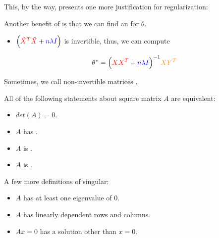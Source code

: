         This, by the way, presents one more justification for regularization:\\

        \begin{concept}
            Another benefit of  is that we can  find an  for $\theta$.

            \begin{itemize}
                \item $\Big ( \textcolor{red}{\tilde{X}^T \tilde{X}} + \textcolor{blue}{n \lambda I} \Big)$ is invertible, thus, we can compute 

                \begin{equation*}
                    \theta^* = \Big ( \textcolor{red}{X X^T} + \textcolor{blue}{n \lambda I} \Big)^{-1} \textcolor{orange}{XY^T}
                \end{equation*}
            \end{itemize}
        \end{concept}

        Sometimes, we call non-invertible matrices .\\

        \begin{definition}
            All of the following statements about square matrix $A$ are equivalent:

            \begin{itemize}
                \item $det(A)=0$.
                \item $A$ has .
                \item $A$ is .
                \item $A$ is .
            \end{itemize}

            
        \end{definition}

        A few more definitions of singular:

        \begin{itemize}
            \item $A$ has at least one eigenvalue of 0.
            \item $A$ has linearly dependent rows and columns.
            \item $Ax=0$ has a solution other than $x=0$.
        \end{itemize}

